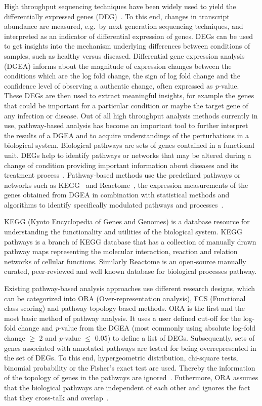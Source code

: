 \documentclass[twocolumn]{article}
\begin{document}
High throughput sequencing techniques have been widely used to yield
the differentially expressed genes (DEG)~\cite{DEG}. To this end,
changes in transcript abundance are measured, e.g.~by next generation
sequencing techniques, and interpreted as an indicator of differential
expression of genes. DEGs can be used to get
insights into the mechanism underlying differences between conditions of samples, such as
healthy versus diseased. Differential gene
expression analysis (DGEA) informs about the magnitude of expression changes
between the conditions which are the log fold change, the sign of log fold change and the confidence level
of observing a authentic change, often expressed as
\textit{p}-value. These DEGs are
then used to extract meaningful insights, for example the genes that
could be important for a particular condition or maybe the target gene
of any infection or disease. Out of all high throughput analysis
methods currently in use, pathway-based analysis has become an
important tool to further interpret the results of a DGEA and to
acquire understandings of the perturbations in a biological
system. Biological pathways are sets of genes contained in a functional
unit. DEGs help to identify pathways or networks that may be altered
during a change of condition providing important information about
diseases and its treatment process~\cite{Khatri2012}. Pathway-based
methods use the predefined pathways or networks such as
KEGG~\cite{Kegg} and Reactome~\cite{Reactome}, the expression
measurements of the genes obtained from DGEA in combination with statistical methods and algorithms to
identify specifically modulated pathways and processes~\cite{Campos}.

KEGG (Kyoto Encyclopedia of Genes and Genomes) is a database resource for understanding the functionality and utilities of the biological system. KEGG pathways is a branch of KEGG database that has a collection of manually drawn pathway maps representing the molecular interaction, reaction and relation networks of cellular functions. Similarly Reactome is an open-source manually curated, peer-reviewed and well known  database for biological processes pathway.

Existing pathway-based analysis approaches use different research
designs, which can be categorized into ORA (Over-representation
analysis), FCS (Functional class scoring) and pathway topology based
methods. ORA is the first and the most basic method of pathway
analysis. It uses a user defined cut-off for the log-fold change and
\textit{p}-value from the DGEA (most commonly using absolute log-fold change
$\geq$ 2 and \textit{p}-value $\leq$ 0.05) to define a list of
DEGs. Subsequently, sets of genes associated
with annotated pathways are tested for being overrepresented in the
set of DEGs. To this end, hypergeometric
distribution, chi-square tests, binomial probability or the Fisher’s
exact test are used. Thereby the information of the topology of genes in the
pathways are ignored~\cite{Bayer}. Futhermore, ORA assumes that the biological
pathways are independent of each other and ignores the fact that they cross-talk and overlap~\cite{Khatri2012,Campos}.
\end{document}
